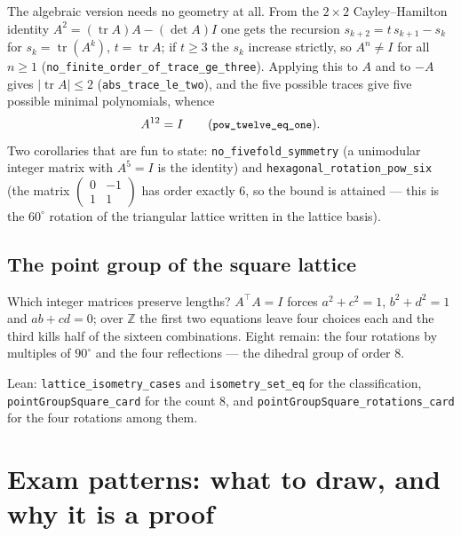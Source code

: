 \documentclass[11pt]{article}
\theoremstyle{definition}
\theoremstyle{plain}
\theoremstyle{remark}
\newcommand{\lean}[1]{\texttt{\small #1}}
\newcommand{\Z}{\mathbb{Z}}
\newcommand{\tr}{\operatorname{tr}}
\begin{document}
The algebraic version needs no geometry at all.  From the $2\times2$
Cayley--Hamilton identity $A^2 = (\tr A)A - (\det A)I$ one gets the recursion
$s_{k+2} = t\,s_{k+1} - s_k$ for $s_k = \tr(A^k)$, $t = \tr A$; if $t \ge 3$ the
$s_k$ increase strictly, so $A^n \ne I$ for all $n\ge1$
(\lean{no\_finite\_order\_of\_trace\_ge\_three}).  Applying this to $A$ and to
$-A$ gives $|\tr A|\le 2$ (\lean{abs\_trace\_le\_two}), and the five possible
traces give five possible minimal polynomials, whence
\[
  A^{12} = I \qquad \text{(\lean{pow\_twelve\_eq\_one})} .
\]
Two corollaries that are fun to state: \lean{no\_fivefold\_symmetry} (a
unimodular integer matrix with $A^5 = I$ is the identity) and
\lean{hexagonal\_rotation\_pow\_six} (the matrix
$\left(\begin{smallmatrix}0&-1\\1&1\end{smallmatrix}\right)$ has order exactly
$6$, so the bound is attained --- this is the $60^\circ$ rotation of the
triangular lattice written in the lattice basis).

\subsection{The point group of the square lattice}

Which integer matrices preserve lengths?  $A^{\!\top}A = I$ forces
$a^2+c^2 = 1$, $b^2+d^2 = 1$ and $ab+cd = 0$; over $\Z$ the first two equations
leave four choices each and the third kills half of the sixteen combinations.
Eight remain: the four rotations by multiples of $90^\circ$ and the four
reflections --- the dihedral group of order $8$.

\begin{center}
\end{center}

\noindent
Lean: \lean{lattice\_isometry\_cases} and \lean{isometry\_set\_eq} for the
classification, \lean{pointGroupSquare\_card} for the count $8$, and
\lean{pointGroupSquare\_rotations\_card} for the four rotations among them.

\section{Exam patterns: what to draw, and why it is a proof}
\end{document}
